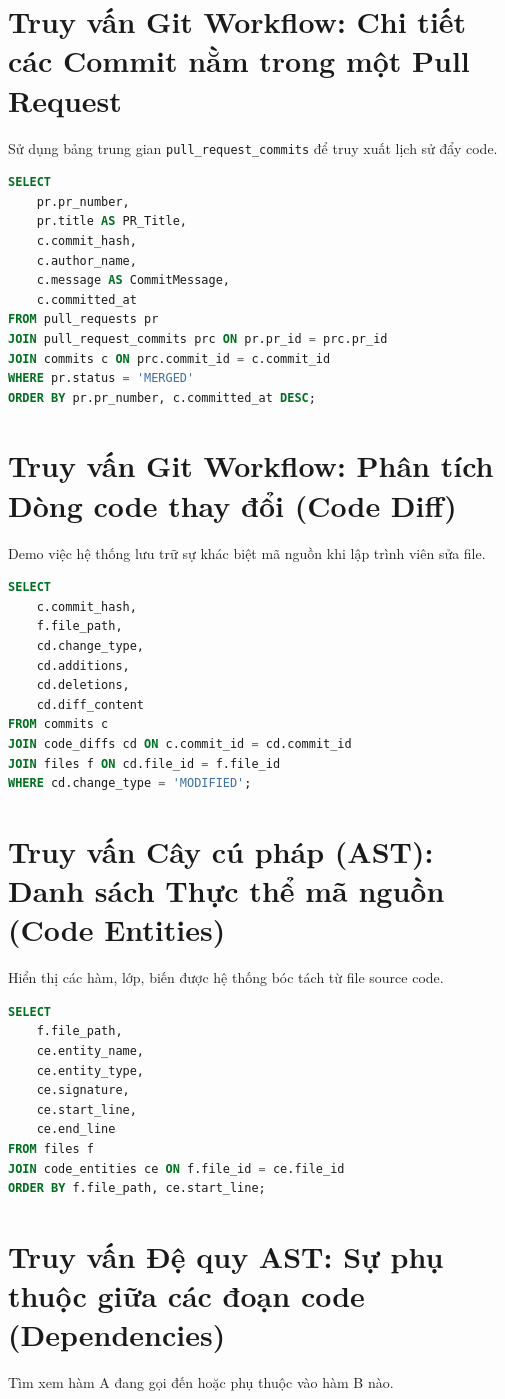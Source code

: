 \section{Truy vấn Git Workflow: Chi tiết các Commit nằm trong một Pull Request}
Sử dụng bảng trung gian \texttt{pull\_request\_commits} để truy xuất lịch sử đẩy code.

\begin{lstlisting}[language=SQL]
SELECT 
    pr.pr_number,
    pr.title AS PR_Title,
    c.commit_hash,
    c.author_name,
    c.message AS CommitMessage,
    c.committed_at
FROM pull_requests pr
JOIN pull_request_commits prc ON pr.pr_id = prc.pr_id
JOIN commits c ON prc.commit_id = c.commit_id
WHERE pr.status = 'MERGED'
ORDER BY pr.pr_number, c.committed_at DESC;
\end{lstlisting}

\section{Truy vấn Git Workflow: Phân tích Dòng code thay đổi (Code Diff)}
Demo việc hệ thống lưu trữ sự khác biệt mã nguồn khi lập trình viên sửa file.

\begin{lstlisting}[language=SQL]
SELECT 
    c.commit_hash,
    f.file_path,
    cd.change_type,
    cd.additions,
    cd.deletions,
    cd.diff_content
FROM commits c
JOIN code_diffs cd ON c.commit_id = cd.commit_id
JOIN files f ON cd.file_id = f.file_id
WHERE cd.change_type = 'MODIFIED';
\end{lstlisting}

\section{Truy vấn Cây cú pháp (AST): Danh sách Thực thể mã nguồn (Code Entities)}
Hiển thị các hàm, lớp, biến được hệ thống bóc tách từ file source code.

\begin{lstlisting}[language=SQL]
SELECT 
    f.file_path,
    ce.entity_name,
    ce.entity_type,
    ce.signature,
    ce.start_line,
    ce.end_line
FROM files f
JOIN code_entities ce ON f.file_id = ce.file_id
ORDER BY f.file_path, ce.start_line;
\end{lstlisting}

\section{Truy vấn Đệ quy AST: Sự phụ thuộc giữa các đoạn code (Dependencies)}
Tìm xem hàm A đang gọi đến hoặc phụ thuộc vào hàm B nào.

